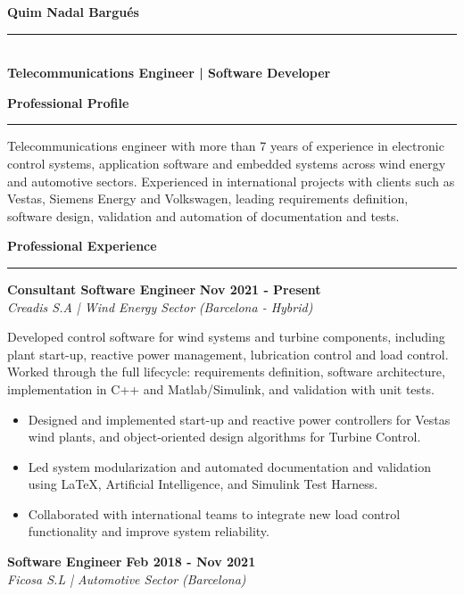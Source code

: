 \documentclass[11pt,a4paper]{article}
\newcommand{\cvsection}[1]{
    \vspace{0.5em}
    \noindent\textbf{\large #1}
    \vspace{0.5em}
    \hrule\vspace{0.5em}
}
\begin{document}
\begin{minipage}[t]{0.68\textwidth} %
    \vspace*{-26\baselineskip} %
    \nointerlineskip
    \begin{flushleft}
        {\fontsize{22}{0}\selectfont\bfseries Quim Nadal Bargués} \\ %
        \vspace{-8pt} %
        \rule{\linewidth}{0.5pt} \\
        \vspace{4pt}
        {\large\bfseries Telecommunications Engineer | Software Developer}
    \end{flushleft}
    
    \cvsection{Professional Profile}
    Telecommunications engineer with more than 7 years of experience in electronic control systems, application 
    software and embedded systems across wind energy and automotive sectors. 
    Experienced in international projects with clients such as Vestas, Siemens Energy and Volkswagen, 
    leading requirements definition, software design, validation and automation of documentation and tests.
   
    \cvsection{Professional Experience}
    
    \noindent
    \textbf{Consultant Software Engineer} \hfill \textbf{Nov 2021 - Present} \\
    \textit{Creadis S.A | Wind Energy Sector} \hfill \textit{(Barcelona - Hybrid)} \vspace{4pt}
    
    Developed control software for wind systems and turbine components, including plant start-up, reactive power management, lubrication control and load control. 
    Worked through the full lifecycle: requirements definition, software architecture, implementation in C++ and Matlab/Simulink, and validation with unit tests.
    \begin{itemize}[leftmargin=*,topsep=2pt,itemsep=-1pt]
        \item Designed and implemented start-up and reactive power controllers for Vestas wind plants, and object-oriented design algorithms for Turbine Control.
        \item Led system modularization and automated documentation and validation using LaTeX, Artificial Intelligence, and Simulink Test Harness.
        \item Collaborated with international teams to integrate new load control functionality and improve system reliability.
    \end{itemize}
    \vspace{10pt}
    \noindent
    \textbf{Software Engineer} \hfill \textbf{Feb 2018 - Nov 2021} \\
    \textit{Ficosa S.L | Automotive Sector} \hfill \textit{(Barcelona)} \vspace{4pt}
    

\end{minipage}
\end{document}

